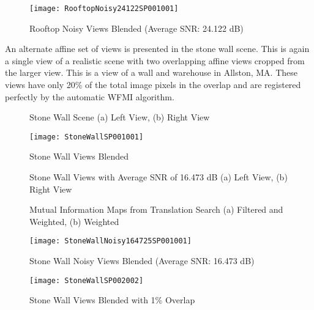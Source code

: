 \begin{figure}[h]
\centering
\texttt{[image: RooftopNoisy24122SP001001]}
\caption{Rooftop Noisy Views Blended (Average SNR: 24.122 dB)}
\label{RooftopNoisyStitched}
\end{figure}




An alternate affine set of views is presented in the stone wall scene. This is again a single view of a realistic scene with two overlapping affine views cropped from the larger view. This is a view of a wall and warehouse in Allston, MA. These views have only 20\% of the total image pixels in the overlap and are registered perfectly by the automatic WFMI algorithm.

\begin{figure}[h]
\label{StoneWallImages}
\centering
{}
\caption{Stone Wall Scene (a) Left View, (b) Right View}
\end{figure}

\begin{figure}[h]
\label{StoneWallStitched}
\centering
\texttt{[image: StoneWallSP001001]}
\caption{Stone Wall Views Blended}
\end{figure}


\begin{figure}[h]
\centering
{}
\caption{Stone Wall Views with Average SNR of 16.473 dB (a) Left View, (b) Right View}
\label{RooftopNoisyImages}
\end{figure}

\begin{figure}[h]
\centering
{}
\caption{Mutual Information Maps from Translation Search (a) Filtered and Weighted, (b) Weighted}
\label{StoneWallNoisyImagesMI}
\end{figure}

\begin{figure}[h]
\centering
\texttt{[image: StoneWallNoisy164725SP001001]}
\caption{Stone Wall Noisy Views Blended (Average SNR: 16.473 dB)}
\label{StoneWallNoisyStitched}
\end{figure}



\begin{figure}[h]
\centering
\texttt{[image: StoneWallSP002002]}
\caption{Stone Wall Views Blended with 1\% Overlap}
\label{StoneWallSmall}
\end{figure}


